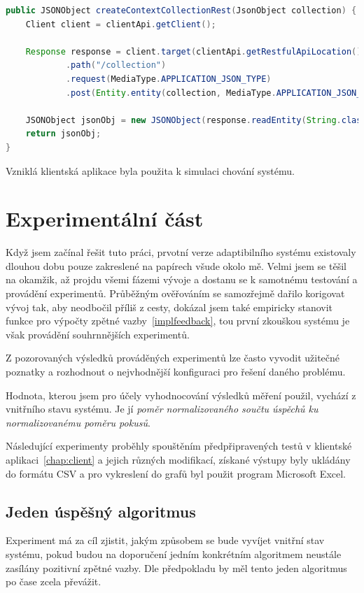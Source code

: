 \documentclass[thesis=M,czech]{FITthesis}[2014/05/07]
\begin{document}
\begin{lstlisting}[language=java]
public JSONObject createContextCollectionRest(JsonObject collection) {
    Client client = clientApi.getClient();

    Response response = client.target(clientApi.getRestfulApiLocation())
            .path("/collection")
            .request(MediaType.APPLICATION_JSON_TYPE)
            .post(Entity.entity(collection, MediaType.APPLICATION_JSON_TYPE));

    JSONObject jsonObj = new JSONObject(response.readEntity(String.class));
    return jsonObj;
}
\end{lstlisting}

Vzniklá klientská aplikace byla použita k simulaci chování systému.

\chapter{Experimentální část}
\label{chap:tests}
Když jsem začínal řešit tuto práci, prvotní verze adaptibilního systému existovaly dlouhou dobu pouze zakreslené na papírech všude okolo mě. Velmi jsem se těšil na okamžik, až projdu všemi fázemi vývoje a dostanu se k samotnému testování a provádění experimentů. Průběžným ověřováním se samozřejmě dařilo korigovat vývoj tak, aby neodbočil příliš z cesty, dokázal jsem také empiricky stanovit funkce pro výpočty zpětné vazby~\ref{implfeedback}, tou první zkouškou systému je však provádění souhrnnějších experimentů.

Z pozorovaných výsledků prováděných experimentů lze často vyvodit užitečné poznatky a rozhodnout o nejvhodnější konfiguraci pro řešení daného problému.

Hodnota, kterou jsem pro účely vyhodnocování výsledků měření použil, vychází z vnitřního stavu systému. Je jí \emph{poměr normalizovaného součtu úspěchů ku normalizovanému poměru pokusů}.

Následující experimenty proběhly spouštěním předpřipravených testů v klientské aplikaci~\ref{chap:client} a jejich různých modifikací, získané výstupy byly ukládány do formátu CSV a pro vykreslení do grafů byl použit program Microsoft Excel.

\section{Jeden úspěšný algoritmus}
Experiment má za cíl zjistit, jakým způsobem se bude vyvíjet vnitřní stav systému, pokud budou na doporučení jedním konkrétním algoritmem neustále zasílány pozitivní zpětné vazby. Dle předpokladu by měl tento jeden algoritmus po čase zcela převážit.
\end{document}
